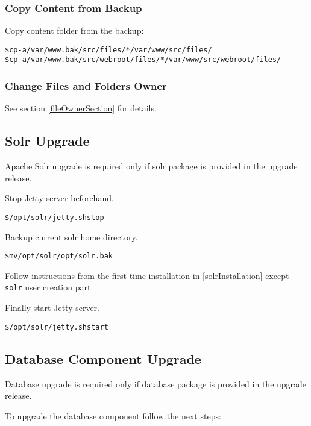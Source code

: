 \documentclass[12pt]{article}
\newcommand{\vigPathToProject}{/var/www}
\newcommand{\vigPathToSrc}{/src}
\begin{document}
\subsubsection{Copy Content from Backup}
Copy content folder from the backup:

\begin{alltt}
\$ cp -a \vigPathToProject.bak\vigPathToSrc/files/* \vigPathToProject\vigPathToSrc/files/
\$ cp -a \vigPathToProject.bak\vigPathToSrc/webroot/files/* \vigPathToProject\vigPathToSrc/webroot/files/
\end{alltt}

\subsubsection{Change Files and Folders Owner}

See section \ref{fileOwnerSection} for details.

\subsection{Solr Upgrade}

Apache Solr upgrade is required only if solr package is provided in the upgrade release.

Stop Jetty server beforehand.

\begin{alltt}
\$ /opt/solr/jetty.sh stop
\end{alltt}

Backup current solr home directory.

\begin{alltt}
\$ mv /opt/solr /opt/solr.bak
\end{alltt}

Follow instructions from the first time installation in \ref{solrInstallation} except \texttt{solr} user creation part.

Finally start Jetty server.

\begin{alltt}
\$ /opt/solr/jetty.sh start
\end{alltt}

\subsection{Database Component Upgrade}

Database upgrade is required only if database package is provided in the upgrade release.

To upgrade the database component follow the next steps:
\end{document}
